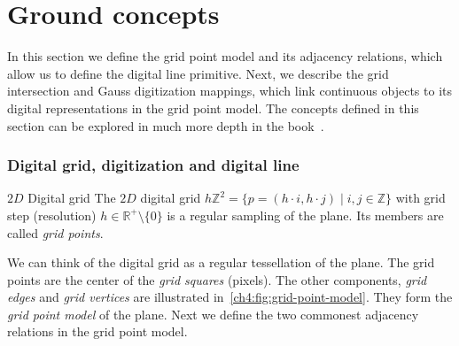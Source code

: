 \section{Ground concepts}\label{ch4:sec:ground-concepts}

In this section we define the grid point model and its adjacency relations, which allow us to define the digital line primitive. Next, we describe the grid intersection and Gauss digitization mappings, which link continuous objects to its digital representations in the grid point model. The concepts defined in this section can be explored in much more depth in the book~\cite{klette04digital}.

\subsubsection{Digital grid, digitization and digital line}

\begin{definition}{$2D$ Digital grid}
The $2D$ digital grid $h\mathbb{Z}^2 = \{ p = (h \cdot i,h \cdot j) \; | \; i,j \in \mathbb{Z}\}$ with grid step (resolution) $h \in \mathbb{R}^+ \setminus \{0\}$ is a regular sampling of the plane. Its members are called \emph{grid points}.
\end{definition}

We can think of the digital grid as a regular tessellation of the plane. The grid points are the center of the \emph{grid squares} (pixels). The other components, \emph{grid edges } and \emph{grid vertices} are illustrated in~\cref{ch4:fig:grid-point-model}. They form the \emph{grid point model} of the plane. Next we define the two commonest adjacency relations in the grid point model.

